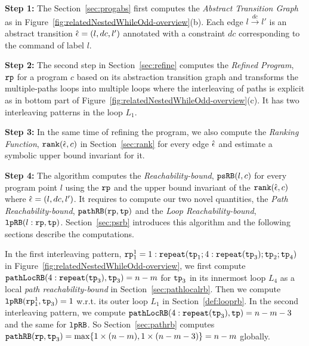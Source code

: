 \textbf{Step 1: }
The Section~\ref{sec:progabs} first 
computes the \emph{Abstract Transition Graph} as in Figure~\ref{fig:relatedNestedWhileOdd-overview}(b).
Each edge $l \xrightarrow{dc} l'$ is an abstract transition $\hat{\mathtt{\epsilon}{}} = (l, dc, l')$ annotated with a constraint $dc$ corresponding to the command of label $l$.

\textbf{Step 2: }
The second step in Section~\ref{sec:refine}
computes the \emph{Refined Program}, $\mathtt{rp}$ for a program $c$ based on 
its abstraction transition graph and transforms the multiple-paths loops
into multiple loops where
the interleaving of paths is explicit as in bottom part of Figure~\ref{fig:relatedNestedWhileOdd-overview}(c).
It has two interleaving patterns in the loop $L_1$.

\textbf{Step 3: }
In the same time of refining the program, we also compute the \emph{Ranking Function}, $\mathtt{rank}(\hat{\mathtt{\epsilon}{}}, c)$ in Section~\ref{sec:rank}
for every edge $\hat{\mathtt{\epsilon}{}}$ 
and estimate a symbolic upper bound invariant for it.

\textbf{Step 4: }
The algorithm computes the \emph{Reachability-bound}, $\mathtt{psRB}(l, c)$ for every program point $l$ using the $\mathtt{rp}$ and the upper bound invariant of the $\mathtt{rank}(\hat{\mathtt{\epsilon}{}}, c)$ where $\hat{\mathtt{\epsilon}{}} = (l,dc,l')$.
It requires to compute our two novel quantities, the \emph{Path Reachability-bound}, $\mathtt{pathRB}(\mathtt{rp}, \mathtt{tp})$ and the \emph{Loop Reachability-bound}, $\mathtt{lpRB}(l: \mathtt{rp}, \mathtt{tp})$.
Section~\ref{sec:psrb} introduces this algorithm and the following sections describe the computations. 

In the first interleaving pattern, $\mathtt{rp}_1^1 = 1: \mathtt{repeat}(\mathtt{tp}_1; 4:\mathtt{repeat}(\mathtt{tp}_3); \mathtt{tp}_2; \mathtt{tp}_4)$ in Figure~\ref{fig:relatedNestedWhileOdd-overview},
we first compute $\mathtt{pathLocRB}(4:\mathtt{repeat}(\mathtt{tp}_3), \mathtt{tp}_3) = n - m$ for $\mathtt{tp}_3$ in its innermost loop $L_4$ as a local \emph{path reachability-bound} in Section~\ref{sec:pathlocalrb}.
Then we compute $\mathtt{lpRB}(\mathtt{rp}_1^1, \mathtt{tp}_3) = 1$ w.r.t. its outer loop $L_1$ in Section~\ref{def:looprb}. In the second interleaving pattern, we compute $\mathtt{pathLocRB}(4:\mathtt{repeat}(\mathtt{tp}_3), \mathtt{tp}) = n - m - 3$ and the same for $\mathtt{lpRB}$.
So Section~\ref{sec:pathrb} computes $\mathtt{pathRB}(\mathtt{rp}, \mathtt{tp}_3) = \max\{ 1 \times (n - m), 1 \times (n - m - 3) \} = n - m$ globally.

